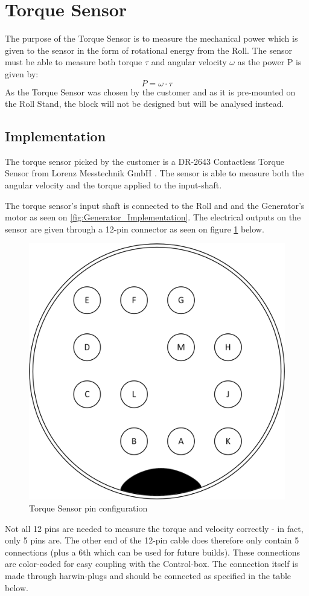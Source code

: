 \newpage
\section{Torque Sensor}
The purpose of the Torque Sensor is to measure the mechanical power which is given to the sensor in the form of rotational energy from the Roll. The sensor must be able to measure both torque $\tau$ and angular velocity $\omega$ as the power P is given by:
\begin{equation}
	P=\omega\cdot\tau
\end{equation}
As the Torque Sensor was chosen by the customer and as it is pre-mounted on the Roll Stand, the block will not be designed but will be analysed instead.

\subsection{Implementation}
The torque sensor picked by the customer is a DR-2643 Contactless Torque Sensor from Lorenz Messtechnik GmbH \cite{TorqueSensor} . The sensor is able to measure both the angular velocity and the torque applied to the input-shaft.

The torque sensor's input shaft is connected to the Roll and and the Generator's motor as seen on \vref{fig:Generator_Implementation}. The electrical outputs on the sensor are given through a 12-pin connector as seen on figure \ref{fig:Torque_pins} below.

\begin{figure}[H]
	\centering
	\includegraphics[width=0.4\linewidth]{Hardware/Pictures/Torque_Sensor_Pins}
	\caption{Torque Sensor pin configuration}
	\label{fig:Torque_pins}
\end{figure}

Not all 12 pins are needed to measure the torque and velocity correctly - in fact, only 5 pins are. The other end of the 12-pin cable does therefore only contain 5 connections (plus a 6th which can be used for future builds). These connections are color-coded for easy coupling with the Control-box. The connection itself is made through harwin-plugs and should be connected as specified in the table below.

